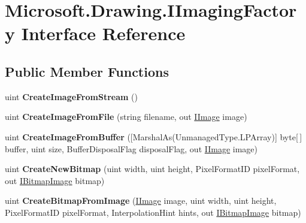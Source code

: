 \hypertarget{interface_microsoft_1_1_drawing_1_1_i_imaging_factory}{
\section{Microsoft.Drawing.IImagingFactory Interface Reference}
\label{interface_microsoft_1_1_drawing_1_1_i_imaging_factory}
}
\subsection*{Public Member Functions}
\begin{DoxyCompactItemize}
\item 
\hypertarget{interface_microsoft_1_1_drawing_1_1_i_imaging_factory_a698c740d6bb8cbfe69549fff6163b468}{
uint {\bfseries CreateImageFromStream} ()}
\label{interface_microsoft_1_1_drawing_1_1_i_imaging_factory_a698c740d6bb8cbfe69549fff6163b468}

\item 
\hypertarget{interface_microsoft_1_1_drawing_1_1_i_imaging_factory_a57ac6ef8e863cd8508af1bb312f05217}{
uint {\bfseries CreateImageFromFile} (string filename, out \hyperlink{interface_microsoft_1_1_drawing_1_1_i_image}{IImage} image)}
\label{interface_microsoft_1_1_drawing_1_1_i_imaging_factory_a57ac6ef8e863cd8508af1bb312f05217}

\item 
\hypertarget{interface_microsoft_1_1_drawing_1_1_i_imaging_factory_a62a0aa3b343f7cbd6c8f2661c6fc6e74}{
uint {\bfseries CreateImageFromBuffer} (\mbox{[}MarshalAs(UnmanagedType.LPArray)\mbox{]} byte\mbox{[}$\,$\mbox{]} buffer, uint size, BufferDisposalFlag disposalFlag, out \hyperlink{interface_microsoft_1_1_drawing_1_1_i_image}{IImage} image)}
\label{interface_microsoft_1_1_drawing_1_1_i_imaging_factory_a62a0aa3b343f7cbd6c8f2661c6fc6e74}

\item 
\hypertarget{interface_microsoft_1_1_drawing_1_1_i_imaging_factory_ae761bb7c59448fbc9550ba7514acf9d3}{
uint {\bfseries CreateNewBitmap} (uint width, uint height, PixelFormatID pixelFormat, out \hyperlink{interface_microsoft_1_1_drawing_1_1_i_bitmap_image}{IBitmapImage} bitmap)}
\label{interface_microsoft_1_1_drawing_1_1_i_imaging_factory_ae761bb7c59448fbc9550ba7514acf9d3}

\item 
\hypertarget{interface_microsoft_1_1_drawing_1_1_i_imaging_factory_aa2589d1ffef2ebf6e5afd7dff785985a}{
uint {\bfseries CreateBitmapFromImage} (\hyperlink{interface_microsoft_1_1_drawing_1_1_i_image}{IImage} image, uint width, uint height, PixelFormatID pixelFormat, InterpolationHint hints, out \hyperlink{interface_microsoft_1_1_drawing_1_1_i_bitmap_image}{IBitmapImage} bitmap)}
\label{interface_microsoft_1_1_drawing_1_1_i_imaging_factory_aa2589d1ffef2ebf6e5afd7dff785985a}


\end{DoxyCompactItemize}
